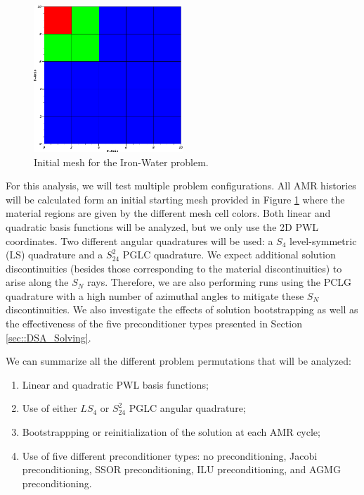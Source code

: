 \begin{figure}
\centering
\includegraphics[width=0.50\textwidth]{figures/sec_DSA/IW_starting_mesh.png}
\caption{Initial mesh for the Iron-Water problem.}
\label{fig::DSA_IW_starting_mesh}
\end{figure}

For this analysis, we will test multiple problem configurations. All AMR histories will be calculated form an initial starting mesh provided in Figure \ref{fig::DSA_IW_starting_mesh} where the material regions are given by the different mesh cell colors. Both linear and quadratic basis functions will be analyzed, but we only use the 2D PWL coordinates. Two different angular quadratures will be used: a $S_4$ level-symmetric (LS) quadrature and a $S_{24}^2$ PGLC quadrature. We expect additional solution discontinuities (besides those corresponding to the material discontinuities) to arise along the $S_N$ rays. Therefore, we are also performing runs using the PCLG quadrature with a high number of azimuthal angles to mitigate these $S_N$ discontinuities. We also investigate the effects of solution bootstrapping as well as the effectiveness of the five preconditioner types presented in Section \ref{sec::DSA_Solving}.

We can summarize all the different problem permutations that will be analyzed:

\begin{enumerate}
\item Linear and quadratic PWL basis functions;
\item Use of either $LS_4$ or $S_{24}^{2}$ PGLC angular quadrature;
\item Bootstrappping or reinitialization of the solution at each AMR cycle;
\item Use of five different preconditioner types: no preconditioning, Jacobi preconditioning, SSOR preconditioning, ILU preconditioning, and AGMG preconditioning.
\end{enumerate}

